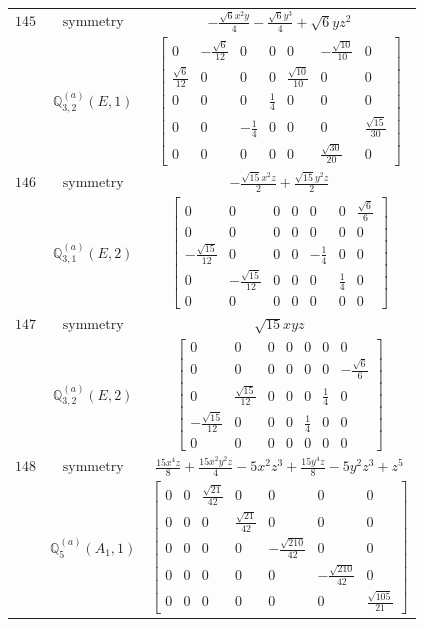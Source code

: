 \documentclass[fleqn,8pt,landscape]{jsarticle}
\begin{document}
\begin{longtable}{ccc}
$ 145 $ & $ \text{symmetry} $ & $ - \frac{\sqrt{6} x^{2} y}{4} - \frac{\sqrt{6} y^{3}}{4} + \sqrt{6} y z^{2} $ \\
$  $ & $ \mathbb{Q}_{3,2}^{(a)}(E,1) $ & $ \begin{bmatrix} 0 & - \frac{\sqrt{6}}{12} & 0 & 0 & 0 & - \frac{\sqrt{10}}{10} & 0 \\ \frac{\sqrt{6}}{12} & 0 & 0 & 0 & \frac{\sqrt{10}}{10} & 0 & 0 \\ 0 & 0 & 0 & \frac{1}{4} & 0 & 0 & 0 \\ 0 & 0 & - \frac{1}{4} & 0 & 0 & 0 & \frac{\sqrt{15}}{30} \\ 0 & 0 & 0 & 0 & 0 & \frac{\sqrt{30}}{20} & 0 \end{bmatrix} $ \\ \hline
$ 146 $ & $ \text{symmetry} $ & $ - \frac{\sqrt{15} x^{2} z}{2} + \frac{\sqrt{15} y^{2} z}{2} $ \\
$  $ & $ \mathbb{Q}_{3,1}^{(a)}(E,2) $ & $ \begin{bmatrix} 0 & 0 & 0 & 0 & 0 & 0 & \frac{\sqrt{6}}{6} \\ 0 & 0 & 0 & 0 & 0 & 0 & 0 \\ - \frac{\sqrt{15}}{12} & 0 & 0 & 0 & - \frac{1}{4} & 0 & 0 \\ 0 & - \frac{\sqrt{15}}{12} & 0 & 0 & 0 & \frac{1}{4} & 0 \\ 0 & 0 & 0 & 0 & 0 & 0 & 0 \end{bmatrix} $ \\ \hline
$ 147 $ & $ \text{symmetry} $ & $ \sqrt{15} x y z $ \\
$  $ & $ \mathbb{Q}_{3,2}^{(a)}(E,2) $ & $ \begin{bmatrix} 0 & 0 & 0 & 0 & 0 & 0 & 0 \\ 0 & 0 & 0 & 0 & 0 & 0 & - \frac{\sqrt{6}}{6} \\ 0 & \frac{\sqrt{15}}{12} & 0 & 0 & 0 & \frac{1}{4} & 0 \\ - \frac{\sqrt{15}}{12} & 0 & 0 & 0 & \frac{1}{4} & 0 & 0 \\ 0 & 0 & 0 & 0 & 0 & 0 & 0 \end{bmatrix} $ \\ \hline
$ 148 $ & $ \text{symmetry} $ & $ \frac{15 x^{4} z}{8} + \frac{15 x^{2} y^{2} z}{4} - 5 x^{2} z^{3} + \frac{15 y^{4} z}{8} - 5 y^{2} z^{3} + z^{5} $ \\
$  $ & $ \mathbb{Q}_{5}^{(a)}(A_{1},1) $ & $ \begin{bmatrix} 0 & 0 & \frac{\sqrt{21}}{42} & 0 & 0 & 0 & 0 \\ 0 & 0 & 0 & \frac{\sqrt{21}}{42} & 0 & 0 & 0 \\ 0 & 0 & 0 & 0 & - \frac{\sqrt{210}}{42} & 0 & 0 \\ 0 & 0 & 0 & 0 & 0 & - \frac{\sqrt{210}}{42} & 0 \\ 0 & 0 & 0 & 0 & 0 & 0 & \frac{\sqrt{105}}{21} \end{bmatrix} $ \\ \hline

\end{longtable}
\end{document}
